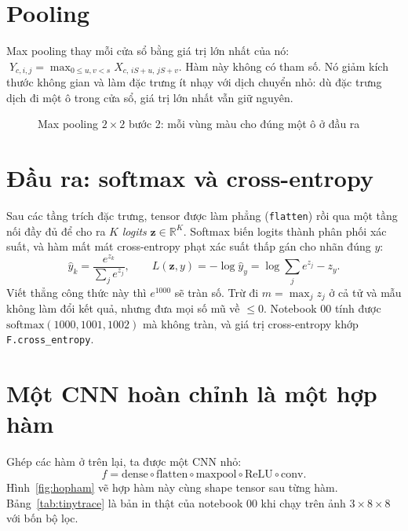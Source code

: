 
\section{Pooling}

Max pooling thay mỗi cửa sổ bằng giá trị lớn nhất của nó:
$\;Y_{c,i,j} = \max_{0\le u,v<s} X_{c,\,iS+u,\,jS+v}$. Hàm này không có tham số. Nó giảm kích thước không gian
và làm đặc trưng ít nhạy với dịch chuyển nhỏ: dù đặc trưng dịch đi một ô trong cửa sổ, giá trị lớn nhất vẫn giữ nguyên.

\begin{figure}[H]
  \centering
  \caption{Max pooling $2\times2$ bước 2: mỗi vùng màu cho đúng một ô ở đầu ra}
  \label{fig:pooling}
\end{figure}


\section{Đầu ra: softmax và cross-entropy}

Sau các tầng trích đặc trưng, tensor được làm phẳng (\texttt{flatten}) rồi qua một tầng nối đầy đủ để
cho ra $K$ \emph{logits} $\mathbf{z}\in\mathbb{R}^K$. Softmax biến logits thành phân phối xác suất, và hàm mất
mát cross-entropy phạt xác suất thấp gán cho nhãn đúng $y$:
\[
  \hat{y}_k = \frac{e^{z_k}}{\sum_j e^{z_j}}, \qquad
  L(\mathbf{z}, y) = -\log \hat{y}_y = \log\sum_j e^{z_j} - z_y .
\]
Viết thẳng công thức này thì $e^{1000}$ sẽ tràn số. Trừ đi $m=\max_j z_j$ ở cả tử và mẫu không làm đổi
kết quả, nhưng đưa mọi số mũ về $\le 0$. Notebook 00 tính được
$\mathrm{softmax}(1000, 1001, 1002)$ mà không tràn, và giá trị cross-entropy khớp \texttt{F.cross\_entropy}.


\section{Một CNN hoàn chỉnh là một hợp hàm}

Ghép các hàm ở trên lại, ta được một CNN nhỏ:
\[
  f = \mathrm{dense}\circ\mathrm{flatten}\circ\mathrm{maxpool}\circ\mathrm{ReLU}\circ\mathrm{conv}.
\]
Hình~\ref{fig:hopham} vẽ hợp hàm này cùng shape tensor sau từng hàm. Bảng~\ref{tab:tinytrace} là bản in thật
của notebook 00 khi chạy trên ảnh $3\times8\times8$ với bốn bộ lọc.

